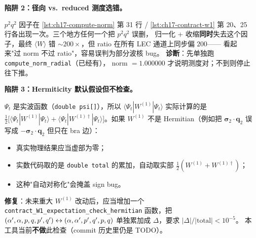 \begin{pitfallbox}[label={box:ch17-pitfall-radial-vs-reduced}]
\textbf{陷阱 2：径向 vs.\ reduced 测度选错。}

\(p^2 q^2\) 因子在 \cref{lst:ch17-compute-norm} 第 31 行 / \cref{lst:ch17-contract-w1}
第 20、25 行各出现一次。三个地方任何一个把 \(p^2 q^2\) 误删，
归一化 + 收缩\textbf{同时}失去这个因子，最终 \(\langle W\rangle\)
错 \(\sim 200\times\)，但 ratio 在所有 LEC 通道上同步偏 \(200\)——
看起来"过 norm 不过 ratio"，容易误判为部分波核 bug。
\textbf{诊断}：先单独跑 \texttt{compute\_norm\_radial}（已经有），
norm \(=1.000000\) 才说明测度对；不到则停止往下推。
\end{pitfallbox}

\begin{pitfallbox}[label={box:ch17-pitfall-hermiticity}]
\textbf{陷阱 3：Hermiticity 默认假设但不检查。}

\(\Psi_t\) 是实波函数（\texttt{double psi[]}），所以
\(\langle\Psi_t|W^{(1)}|\Psi_t\rangle\) 实际计算的是
\(\frac{1}{2}\bigl[\langle\Psi_t|W^{(1)}|\Psi_t\rangle +
\langle\Psi_t|W^{(1)\dagger}|\Psi_t\rangle\bigr]\)。如果 \(W^{(1)}\) 不是
Hermitian（例如把 \(\bm{\sigma}_2 \cdot \bm{q}_2\) 误写成
\(-\bm{\sigma}_2 \cdot \bm{q}_2\) 但只在 bra 边）：

\begin{itemize}
  \item 真实物理结果应当虚部为零；
  \item 实数代码取的是 \texttt{double total} 的累加，自动取实部
        \(\frac{1}{2}(W^{(1)} + W^{(1)\dagger})\)；
  \item 这种"自动对称化"会掩盖 sign bug。
\end{itemize}

\textbf{修复}：未来重大 \(W^{(1)}\) 改动后，应当增加一个
\texttt{contract\_W1\_expectation\_check\_hermitian} 函数，把
\((\alpha', \alpha, p, q, p', q') \leftrightarrow (\alpha, \alpha', p', q', p, q)\)
单独累加成 \(\Delta\)，要求 \(|\Delta| / |\text{total}| < 10^{-5}\)。
本工具当前\textbf{不做}此检查（commit 历史里仍是 TODO）。
\end{pitfallbox}

